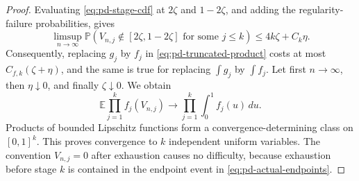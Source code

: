 \documentclass[11pt]{article}
\theoremstyle{remark}
\newcommand{\Pp}{\mathbb P}
\newcommand{\Ee}{\mathbb E}
\newcommand{\dd}{\,d}
\begin{document}
\begin{proof}
Evaluating \eqref{eq:pd-stage-cdf} at $2\zeta$ and $1-2\zeta$, and adding the
regularity-failure probabilities, gives
\begin{equation}
 \limsup_{n\to\infty}\Pp\left(
 V_{n,j}\notin[2\zeta,1-2\zeta]
 \text{ for some }j\le k\right)
 \le4k\zeta+C_k\eta.
 \label{eq:pd-actual-endpoints}
\end{equation}
Consequently, replacing $g_j$ by $f_j$ in
\eqref{eq:pd-truncated-product} costs at most
$C_{f,k}(\zeta+\eta)$, and the same is true for replacing
$\int g_j$ by $\int f_j$.  Let first $n\to\infty$, then
$\eta\downarrow0$, and finally $\zeta\downarrow0$.  We obtain
\[
        \Ee\prod_{j=1}^kf_j(V_{n,j})
        \longrightarrow
        \prod_{j=1}^k\int_0^1f_j(u)\dd u.
\]
Products of bounded Lipschitz functions form a convergence-determining class on
$[0,1]^k$.  This proves convergence to $k$ independent uniform variables.
The convention $V_{n,j}=0$ after exhaustion causes no difficulty, because
exhaustion before stage $k$ is contained in the endpoint event in
\eqref{eq:pd-actual-endpoints}.
\end{proof}
\end{document}
